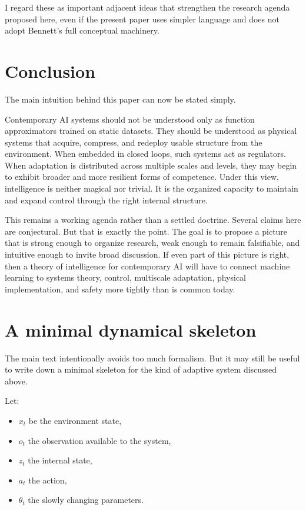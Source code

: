 \documentclass[11pt]{article}
\begin{document}
I regard these as important adjacent ideas that strengthen the research agenda proposed here, even if the present paper uses simpler language and does not adopt Bennett's full conceptual machinery.

\section{Conclusion}

The main intuition behind this paper can now be stated simply.

Contemporary AI systems should not be understood only as function approximators trained on static datasets. They should be understood as physical systems that acquire, compress, and redeploy usable structure from the environment. When embedded in closed loops, such systems act as regulators. When adaptation is distributed across multiple scales and levels, they may begin to exhibit broader and more resilient forms of competence. Under this view, intelligence is neither magical nor trivial. It is the organized capacity to maintain and expand control through the right internal structure.

This remains a working agenda rather than a settled doctrine. Several claims here are conjectural. But that is exactly the point. The goal is to propose a picture that is strong enough to organize research, weak enough to remain falsifiable, and intuitive enough to invite broad discussion. If even part of this picture is right, then a theory of intelligence for contemporary AI will have to connect machine learning to systems theory, control, multiscale adaptation, physical implementation, and safety more tightly than is common today.

\appendix

\section{A minimal dynamical skeleton}

The main text intentionally avoids too much formalism. But it may still be useful to write down a minimal skeleton for the kind of adaptive system discussed above.

Let:

\begin{itemize}
\item \(x_t\) be the environment state,
\item \(o_t\) the observation available to the system,
\item \(z_t\) the internal state,
\item \(a_t\) the action,
\item \(\theta_t\) the slowly changing parameters.
\end{itemize}
\end{document}
